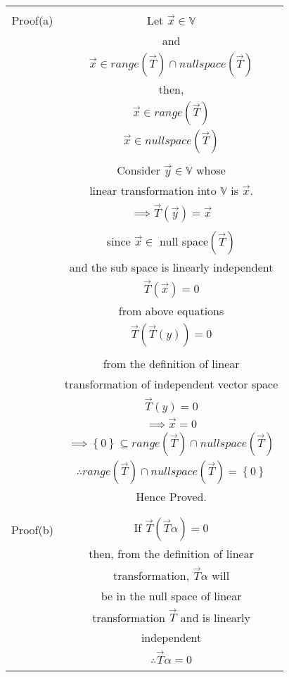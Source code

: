 \documentclass[journal,12pt,twocolumn]{IEEEtran}
\begin{document}
\begin{table}[h!]
\begin{center}
\begin{tabular}{|c|c|}
\hline
& \\
Proof(a) & Let $\vec{x} \in \mathbb{V}$\\
& and \\
& $\vec{x} \in range(\vec{T}) \cap null space(\vec{T})$\\
& then,\\
& $\vec{x} \in range(\vec{T})$\\
& $\vec{x} \in null space(\vec{T})$\\
& \\
& Consider $\vec{y} \in \mathbb{V}$ whose\\
& linear transformation into $\mathbb{V}$ is $\vec{x}$.\\
& $\implies \vec{T}(\vec{y}) = \vec{x}$\\
& \\
& since $\vec{x} \in $ null space$(\vec{T})$ \\
& and the sub space is linearly independent \\
& $\vec{T}(\vec{x}) = 0$\\
& from above equations \\
& $\vec{T}(\vec{T}(y)) = 0$\\
& \\
& from the definition of linear\\
& transformation of independent vector space\\
& $\vec{T}(y) = 0$\\
& $\implies \vec{x} = 0$\\
& $\implies \left\lbrace 0 \right\rbrace \subseteq range(\vec{T}) \cap null space(\vec{T})$ \\
& $\therefore range(\vec{T}) \cap null space(\vec{T}) = \left\lbrace 0 \right\rbrace$\\
& Hence Proved.\\
& \\
\hline
& \\
Proof(b) & If $\vec{T}(\vec{T}\alpha) = 0$\\
& then, from the definition of linear\\
& transformation, $\vec{T}\alpha$ will \\
& be in the null space of linear \\
& transformation $\vec{T}$ and is linearly \\
& independent \\
& $\therefore \vec{T}\alpha = 0$\\
& \\
\hline
\end{tabular}
\end{center}
\end{table}
\end{document}
